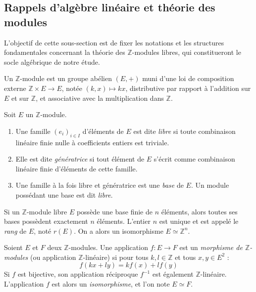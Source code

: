 \subsection{Rappels d'algèbre linéaire et théorie des modules}

L'objectif de cette sous-section est de fixer les notations et les structures fondamentales concernant la théorie des $\mathbb{Z}$-modules libres, qui constitueront le socle algébrique de notre étude.

\begin{definition}
Un $\mathbb{Z}$-module est un groupe abélien $(E, +)$ muni d'une loi de composition externe $\mathbb{Z} \times E \to E$, notée $(k, x) \mapsto kx$, distributive par rapport à l'addition sur $E$ et sur $\mathbb{Z}$, et associative avec la multiplication dans $\mathbb{Z}$.
\end{definition}

\begin{definition}
Soit $E$ un $\mathbb{Z}$-module. 
\begin{enumerate}
    \item Une famille $(e_i)_{i \in I}$ d'éléments de $E$ est dite \emph{libre} si toute combinaison linéaire finie nulle à coefficients entiers est triviale.
    \item Elle est dite \emph{génératrice} si tout élément de $E$ s'écrit comme combinaison linéaire finie d'éléments de cette famille.
    \item Une famille à la fois libre et génératrice est une \emph{base} de $E$. Un module possédant une base est dit \emph{libre}.
\end{enumerate}
\end{definition}

\begin{proposition}
Si un $\mathbb{Z}$-module libre $E$ possède une base finie de $n$ éléments, alors toutes ses bases possèdent exactement $n$ éléments. L'entier $n$ est unique et est appelé le \emph{rang} de $E$, noté $r(E)$. On a alors un isomorphisme $E \simeq \mathbb{Z}^n$.
\end{proposition}


\begin{definition}
Soient $E$ et $F$ deux $\mathbb{Z}$-modules. Une application $f : E \to F$ est un \emph{morphisme de $\mathbb{Z}$-modules} (ou application $\mathbb{Z}$-linéaire) si pour tous $k, l \in \mathbb{Z}$ et tous $x, y \in E^2$ :
\[
f(kx + ly) = kf(x) + lf(y)
\]
Si $f$ est bijective, son application réciproque $f^{-1}$ est également $\mathbb{Z}$-linéaire. L'application $f$ est alors un \emph{isomorphisme}, et l'on note $E \simeq F$.
\end{definition}


